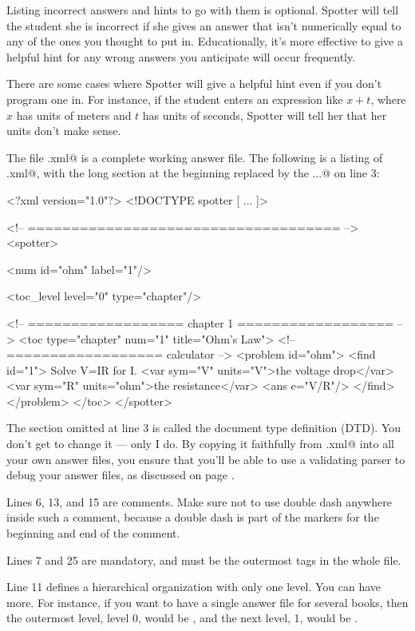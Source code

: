 \documentclass{doc}
\begin{document}
Listing incorrect answers and hints to go with them is optional. Spotter will tell
the student she is incorrect if she gives an answer that isn't numerically equal
to any of the ones you thought to put in. Educationally, it's more
effective to give a helpful hint for any wrong answers you anticipate will occur
frequently.

There are some cases where Spotter will give a helpful hint even if you don't
program one in. For instance, if the student enters an expression like
$x+t$, where $x$ has units of meters and $t$ has units of seconds, Spotter
will tell her that her units don't make sense.

The file \verb@sample.xml@ is a complete working answer file. The following is a
listing of \verb@sample.xml@, with the long section at the beginning replaced
by the \verb@...@ on line 3:

\begin{listing}{1}
<?xml version="1.0"?>
<!DOCTYPE spotter [
...
]>

<!-- ==================================== -->
<spotter>

<num id="ohm" label="1"/>

 <toc_level level="0" type="chapter"/>

<!-- ================== chapter 1 ================== -->
<toc type="chapter" num="1" title="Ohm's Law">
 <!-- ================== calculator -->
   <problem id="ohm">
        <find id="1">
          Solve V=IR for I.
          <var sym="V" units="V">the voltage drop</var>
          <var sym="R" units="ohm">the resistance</var>
          <ans e="V/R"/>
        </find>
    </problem>
</toc>
</spotter>\end{listing}
 
 The section omitted at line 3 is called the document type definition (DTD).
 You don't get to change it --- only I do. By copying it faithfully from
 \verb@sample.xml@ into all your own answer files, you ensure that
  you'll be able to use a validating parser to debug your answer files,
  as discussed on page \pageref{debugginganswerfile}.
  
  Lines 6, 13, and 15 are comments. Make sure not to use double dash anywhere
  inside such a comment, because a double dash is part of the markers for the
  beginning and end of the comment.
  
  Lines 7 and 25 are mandatory, and must be the outermost tags in the whole file.
  
  Line 11 defines a hierarchical organization with only one level. You can have
  more. For instance, if you want to have a single answer file for several books,
  then the outermost level, level 0, would be \verb@book@, and the next level, 1, 
  would be \verb@chapter@.
  
\end{document}
